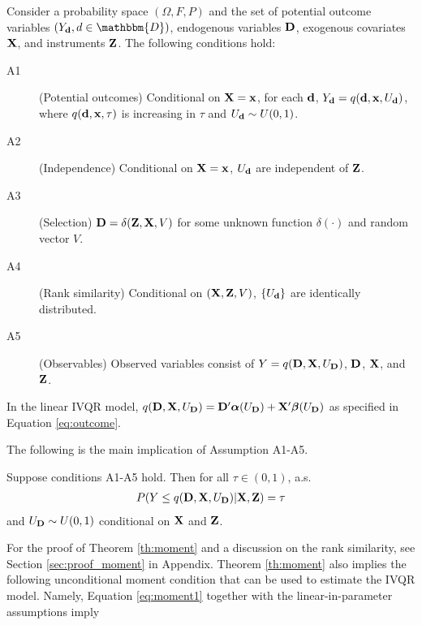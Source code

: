 \begin{assumption}
  \label{assum:ivqr}

Consider a probability space $(\Omega, F, P)$ and the set of potential outcome
variables $(\Yd, d \in \mathbbm{D})$, endogenous variables $\mathbf{D}$, exogenous
covariates $\mathbf{X}$, and instruments $\mathbf{Z}$. The following conditions hold:

\begin{description}

\item[A1] (Potential outcomes) Conditional on $\mathbf{X}=\mathbf{x}$, for each $\mathbf{d}$, $Y_{\mathbf{d}} =
q(\mathbf{d}, \mathbf{x}, U_{\mathbf{d}})$, where $q(\mathbf{d}, \mathbf{x}, \tau)$ is increasing in $\tau$ and $U_{\mathbf{d}}
\sim U(0, 1)$.

\item[A2] (Independence) Conditional on $\mathbf{X}=\mathbf{x}$, $U_{\mathbf{d}}$ are independent of
$\mathbf{Z}$.

\item[A3] (Selection) $\mathbf{D} = \delta(\mathbf{Z}, \mathbf{X}, V)$ for some unknown function
$\delta(\cdot)$ and random vector $V$.

\item[A4] (Rank similarity) Conditional on $(\mathbf{X}, \mathbf{Z}, V)$, $\{U_{\mathbf{d}}\}$ are
identically distributed.

\item[A5] (Observables) Observed variables consist of $Y = q(\mathbf{D}, \mathbf{X}, U_{\mathbf{D}})$,
$\mathbf{D}$, $\mathbf{X}$, and $\mathbf{Z}$.

\end{description}
\end{assumption}

In the linear IVQR model, $q(\mathbf{D}, \mathbf{X}, U_{\mathbf{D}}) = \mathbf{D}'\boldsymbol{\alpha}(U_{\mathbf{D}}) +
\mathbf{X}'\boldsymbol{\beta}(U_{\mathbf{D}})$ as specified in Equation \ref{eq:outcome}.

The following is the main implication of Assumption A1-A5.

\begin{theorem}\label{th:moment}
Suppose conditions A1-A5 hold. Then for all $\tau \in (0, 1)$, a.s.
\begin{align}
	P(Y \leq q(\mathbf{D}, \mathbf{X}, U_{\mathbf{D}}) | \mathbf{X}, \mathbf{Z}) = \tau
	\label{eq:moment1}
\end{align}
and $U_{\mathbf{D}} \sim U(0,1)$ conditional on $\mathbf{X}$ and $\mathbf{Z}$.
\end{theorem}

For the proof of Theorem \ref{th:moment} and a discussion on the rank
similarity, see Section \ref{sec:proof_moment} in Appendix.  Theorem
\ref{th:moment} also implies the following unconditional moment condition that
can be used to estimate the IVQR model. Namely, Equation \ref{eq:moment1}
together with the linear-in-parameter assumptions imply

